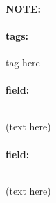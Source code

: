 \documentclass[12pt]{article}
\newenvironment{note}{\paragraph{NOTE:}}{}
\newenvironment{field}{\paragraph{field:}}{}
\newcommand*{\tags}[1]{\paragraph{tags: }#1}
\begin{document}
\begin{note}
    \tags{tag here}
    \begin{field}
    \[  

    \] 
    \begin{center}
    (text here)
    \end{center}
    \end{field}
    \begin{field}
    \[
 
    \] 
    \begin{center}
    (text here)
    \end{center}
    \end{field}
\end{note}
\end{document}

